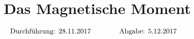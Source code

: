 

\subject{v105}
\title{Das Magnetische Moment}

\date{
  \begin{align}
    \text{Durchführung: } & \text{28.11.2017} & \hspace{3em} & \text{Abgabe: 5.12.2017} \notag
  \end{align}
}




\maketitle
\thispagestyle{empty}
\tableofcontents
\newpage

\nocite{*}






\printbibliography{}


